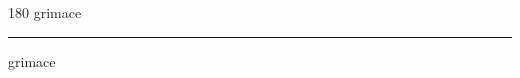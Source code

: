 
\begin{frame}
\begin{center}
\begin{turn}{180}
{\fontsize{2.5cm}{1em}\selectfont grimace}
\end{turn}
\vspace{1em}\par  
\hrule
\vspace{1em}\par  
{\fontsize{2.5cm}{1em}\selectfont grimace}
\end{center}
\end{frame}
